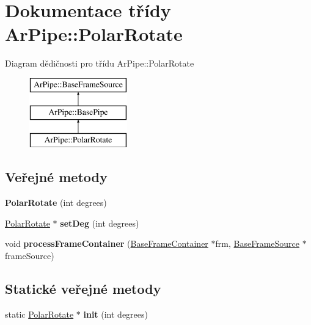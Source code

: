\hypertarget{class_ar_pipe_1_1_polar_rotate}{\section{Dokumentace třídy Ar\-Pipe\-:\-:Polar\-Rotate}
\label{da/dd5/class_ar_pipe_1_1_polar_rotate}
}
Diagram dědičnosti pro třídu Ar\-Pipe\-:\-:Polar\-Rotate\begin{figure}[H]
\begin{center}
\leavevmode
\includegraphics[height=3.000000cm]{da/dd5/class_ar_pipe_1_1_polar_rotate}
\end{center}
\end{figure}
\subsection*{Veřejné metody}
\begin{DoxyCompactItemize}
\item 
\hypertarget{class_ar_pipe_1_1_polar_rotate_a2c757268e7a78676fb11a72e7bd86e23}{{\bfseries Polar\-Rotate} (int degrees)}\label{da/dd5/class_ar_pipe_1_1_polar_rotate_a2c757268e7a78676fb11a72e7bd86e23}

\item 
\hypertarget{class_ar_pipe_1_1_polar_rotate_a7cd6e087a8065c73d5890b7a9aa7ed74}{\hyperlink{class_ar_pipe_1_1_polar_rotate}{Polar\-Rotate} $\ast$ {\bfseries set\-Deg} (int degrees)}\label{da/dd5/class_ar_pipe_1_1_polar_rotate_a7cd6e087a8065c73d5890b7a9aa7ed74}

\item 
\hypertarget{class_ar_pipe_1_1_polar_rotate_a2b1124780691c558e491c8aeb04e3a4c}{void {\bfseries process\-Frame\-Container} (\hyperlink{class_ar_pipe_1_1_base_frame_container}{Base\-Frame\-Container} $\ast$frm, \hyperlink{class_ar_pipe_1_1_base_frame_source}{Base\-Frame\-Source} $\ast$frame\-Source)}\label{da/dd5/class_ar_pipe_1_1_polar_rotate_a2b1124780691c558e491c8aeb04e3a4c}

\end{DoxyCompactItemize}
\subsection*{Statické veřejné metody}
\begin{DoxyCompactItemize}
\item 
\hypertarget{class_ar_pipe_1_1_polar_rotate_a2f0b3f1b219f81c69660725af826e9f8}{static \hyperlink{class_ar_pipe_1_1_polar_rotate}{Polar\-Rotate} $\ast$ {\bfseries init} (int degrees)}\label{da/dd5/class_ar_pipe_1_1_polar_rotate_a2f0b3f1b219f81c69660725af826e9f8}

\end{DoxyCompactItemize}
